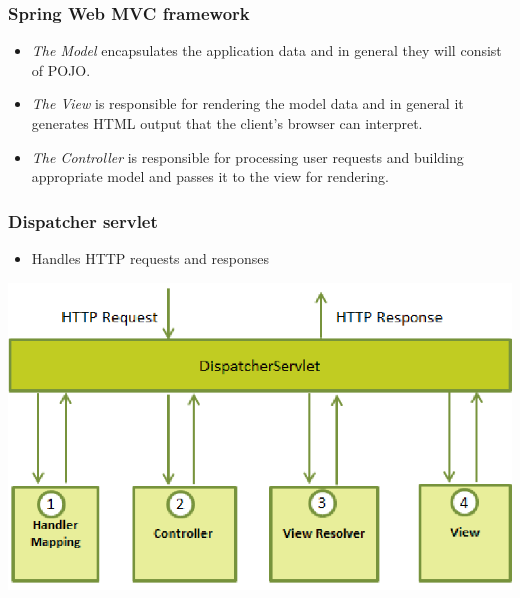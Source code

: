 \documentclass[10pt,xcolor=pdflatex, table]{beamer}
\begin{document}
\begin{frame}\frametitle{Spring Web MVC framework}
	\begin{itemize}
    	\item \emph{The Model} encapsulates the application data and in general they will consist of POJO.
        \medskip
    	\item \emph{The View} is responsible for rendering the model data and in general it generates HTML output that the client's browser can interpret.
        \medskip
    	\item \emph{The Controller} is responsible for processing user requests and building appropriate model and passes it to the view for rendering.
	\end{itemize}
\end{frame}


\begin{frame}\frametitle{Dispatcher servlet}
	\begin{itemize}
		\item Handles HTTP requests and responses
	\end{itemize}
    \begin{center}
  \includegraphics[scale=0.41]{img/obr3}
\end{center}
\end{frame}
\end{document}

